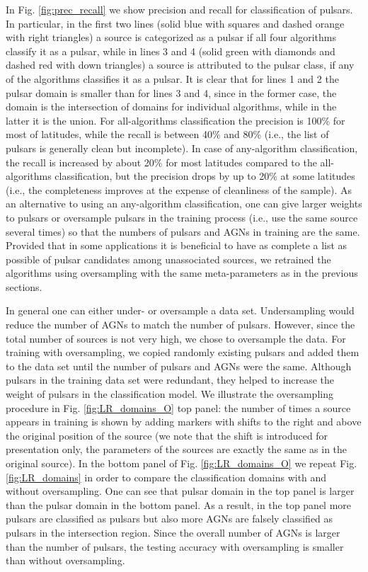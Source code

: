 \documentclass[referee]{aa} %
\begin{document}
In Fig. \ref{fig:prec_recall} we show precision and recall for classification of pulsars.
In particular, in the first two lines (solid blue with squares and dashed orange with right triangles) a source is categorized as a pulsar if all four algorithms classify it as a pulsar,
while in lines 3 and 4 (solid green with diamonds and dashed red with down triangles) a source is attributed to the pulsar class, if any of the algorithms classifies it as a pulsar.
It is clear that for lines 1 and 2 the pulsar domain is smaller than for lines 3 and 4, since in the former case, the domain is the intersection of domains for individual algorithms, while in the latter it is the union.
For all-algorithms classification the precision is 100\% for most of latitudes, while the recall is between 40\% and 80\% (i.e., the list of pulsars is generally clean but incomplete).
In case of any-algorithm classification, the recall is increased by about 20\% for most latitudes compared to the all-algorithms classification, but the precision drops by up to 20\% at some latitudes (i.e., the completeness improves at the expense of cleanliness of the sample).
As an alternative to using an any-algorithm classification, one can give larger weights to pulsars or oversample pulsars in the training process (i.e., use the same source several times) so that the numbers of pulsars and AGNs in training are the same.
Provided that in some applications it is beneficial to have as complete a list as possible of pulsar candidates among unassociated sources, we retrained the algorithms using oversampling with the same meta-parameters as in the previous sections.

In general one can either under- or oversample a data set. Undersampling would reduce the number of AGNs to match the number of pulsars. However, since the total number of sources is not very high, we chose to oversample the data. 
For training with oversampling, we copied randomly existing pulsars and added them to the data set until the number of pulsars and AGNs were the same.
Although pulsars in the training data set were redundant, they helped to increase the weight of pulsars in the classification model.
We illustrate the oversampling procedure in Fig. \ref{fig:LR_domains_O} top panel:
the number of times a source appears in training is shown by adding markers with shifts to the right and above the original position of the source (we note that the shift is introduced for presentation only, the parameters of the sources are exactly the same as in the original source).
In the bottom panel of Fig. \ref{fig:LR_domains_O} we repeat Fig.  \ref{fig:LR_domains} in order to compare the classification domains with and without oversampling.
One can see that pulsar domain in the top panel is larger than the pulsar domain in the bottom panel.
As a result, in the top panel more pulsars are classified as pulsars but also more AGNs are falsely classified as pulsars in the intersection region. 
Since the overall number of AGNs is larger than the number of pulsars, the testing accuracy with oversampling is smaller than without oversampling.
\end{document}
